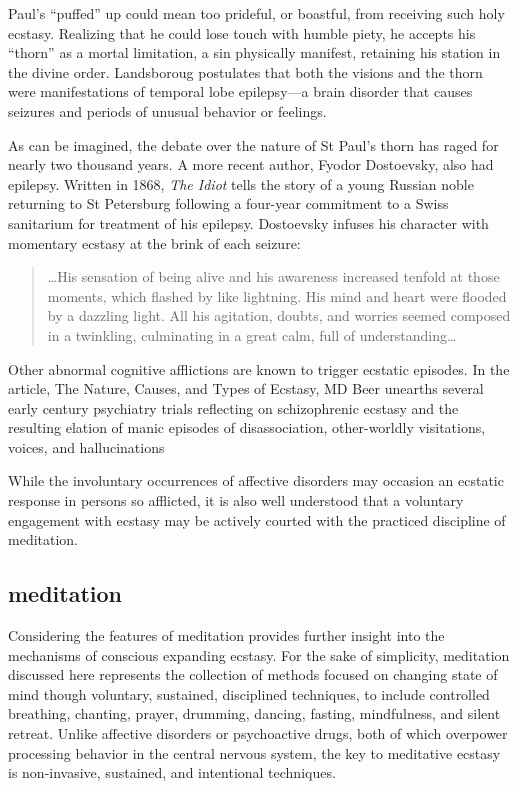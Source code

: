 \documentclass{UIdahoMastersThesis}
\begin{document}
Paul's ``puffed'' up could mean too prideful, or boastful, from receiving such holy ecstasy. Realizing that he could lose touch with humble piety, he accepts his ``thorn'' as a mortal limitation, a sin physically manifest, retaining his station in the divine order. Landsboroug postulates that both the visions and the thorn were manifestations of temporal lobe epilepsy---a brain disorder that causes seizures and periods of unusual behavior or feelings.

As can be imagined, the debate over the nature of St Paul's thorn has raged for nearly two thousand years. A more recent author, Fyodor Dostoevsky, also had epilepsy. Written in 1868, \emph{The Idiot} tells the story of a young Russian noble returning to St Petersburg following a four-year commitment to a Swiss sanitarium for treatment of his epilepsy. Dostoevsky infuses his character with momentary ecstasy at the brink of each seizure:

\begin{quote}
{\ldots His sensation of being alive and his awareness increased tenfold at those moments, which flashed by like lightning. His mind and heart were flooded by a dazzling light. All his agitation, doubts, and worries seemed composed in a twinkling, culminating in a great calm, full of understanding\ldots}\cite{bible_new_1984}
\end{quote}

Other abnormal cognitive afflictions are known to trigger ecstatic episodes. In the article, The Nature, Causes, and Types of Ecstasy, MD Beer unearths several early  century psychiatry trials reflecting on schizophrenic ecstasy and the resulting elation of manic episodes of disassociation, other-worldly visitations, voices, and hallucinations \cite{beer_nature_2000}

While the involuntary occurrences of affective disorders may occasion an ecstatic response in persons so afflicted, it is also well understood that a voluntary engagement with ecstasy may be actively courted with the practiced discipline of meditation.

\newpage
\noindent
{%
\setlength{\fboxsep}{0pt}%
\setlength{\fboxrule}{1.5pt}%
%
}%
\subsection{meditation}

Considering the features of meditation provides further insight into the mechanisms of conscious expanding ecstasy. For the sake of simplicity, meditation discussed here represents the collection of methods focused on changing state of mind though voluntary, sustained, disciplined techniques, to include controlled breathing, chanting, prayer, drumming, dancing, fasting, mindfulness, and silent retreat. Unlike affective disorders or psychoactive drugs, both of which overpower processing behavior in the central nervous system, the key to meditative ecstasy is non-invasive, sustained, and intentional techniques.
\end{document}
